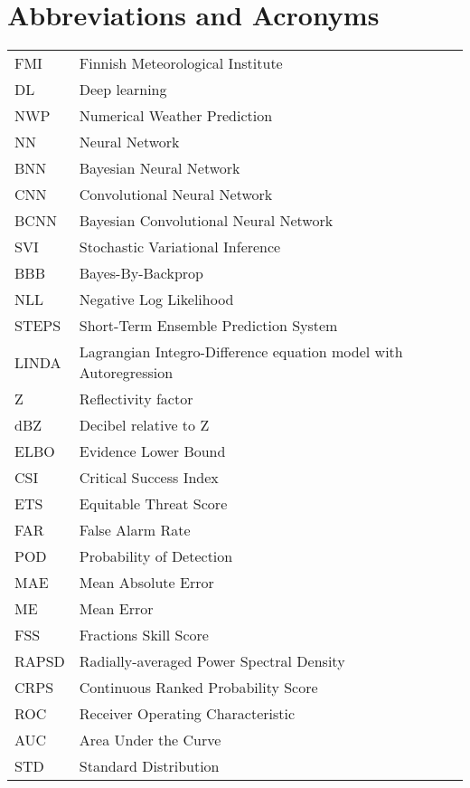 \chapter*{Abbreviations and Acronyms}


\noindent
\begin{longtable}{@{}p{}p{}@{}}
FMI & Finnish Meteorological Institute \\
DL & Deep learning \\
NWP & Numerical Weather Prediction \\
NN & Neural Network \\
BNN & Bayesian Neural Network \\
CNN & Convolutional Neural Network \\
BCNN & Bayesian Convolutional Neural Network \\
SVI & Stochastic Variational Inference \\
BBB & Bayes-By-Backprop \\
NLL & Negative Log Likelihood \\
STEPS & Short-Term Ensemble Prediction System \\
LINDA & Lagrangian Integro-Difference equation model with Autoregression\\
Z & Reflectivity factor \\
dBZ & Decibel relative to Z \\
ELBO & Evidence Lower Bound \\
CSI & Critical Success Index \\
ETS & Equitable Threat Score \\
FAR & False Alarm Rate \\
POD & Probability of Detection \\
MAE & Mean Absolute Error \\
ME & Mean Error \\
FSS & Fractions Skill Score \\
RAPSD & Radially-averaged Power Spectral Density \\
CRPS & Continuous Ranked Probability Score \\
ROC & Receiver Operating Characteristic \\
AUC & Area Under the Curve \\
STD & Standard Distribution \\
\end{longtable}
